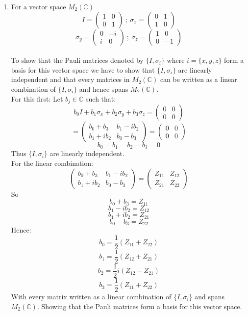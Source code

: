 \documentclass[12pt]{article}
\begin{document}
\begin{enumerate}
\begin{enumerate}
    \item For a vector space $M_2 (\mathbb{C})$
$$
I = \left( \begin{array}{cc} 1 & 0 \\ 0 & 1 \end{array} \right)  \ ; \ \sigma_x = \left( \begin{array}{cc} 0 & 1 \\ 1 & 0 \end{array} \right) 
$$
$$
\sigma_y = \left( \begin{array}{cc} 0 & -i \\ i & 0 \end{array} \right)  \ ; \ \sigma_z = \left( \begin{array}{cc} 1 & 0 \\ 0 & -1 \end{array} \right) 
$$
\\
To show that the Pauli matrices denoted by $\{I,\sigma_i\}$ where $i = \{x,y,z\}$ form a basis for this vector space we have to show that $\{I,\sigma_i\}$ are linearly independent and that every matrices in $M_2(\mathbb{C})$ can be written as a linear combination of $\{I,\sigma_i\}$ and hence spans $M_2(\mathbb{C})$.
\\ For this first: Let $b_j \in \mathbb{C}$ such that: 
$$ 
b_0 I +b_1 \sigma_x + b_2 \sigma_y + b_3 \sigma_z = \left( \begin{array}{cc} 0 & 0 \\ 0 & 0 \end{array} \right)
$$
$$ 
 = \left( \begin{array}{cc} b_0+b_3 & b_1-ib_2 \\ b_1+ib_2 & b_0-b_3 \end{array} \right) = \left( \begin{array}{cc} 0 & 0 \\ 0 & 0 \end{array} \right)
$$
$$
b_0 = b_1 =b_2 =b_3=0 $$
Thus $\{I,\sigma_i\}$ are linearly independent.
\\
For the linear combination:
$$ 
\left( \begin{array}{cc} b_0+b_3 & b_1-ib_2 \\ b_1+ib_2 & b_0-b_3 \end{array} \right) = \left( \begin{array}{cc} Z_{11} & Z_{12} \\ Z_{21} & Z_{22} \end{array} \right)
$$
So
$$ b_0 +b_3 = Z_{11} $$
$$ b_1 -ib_2 = Z_{12} $$
$$ b_1 +ib_2 = Z_{21} $$
$$ b_0 - b_3 = Z_{22} $$
Hence:
$$ b_0 = \frac{1}{2} (Z_{11} + Z_{22}) $$
$$ b_1 = \frac{1}{2}(Z_{12} +Z_{21}) $$
$$ b_2 = \frac{1}{2}i(Z_{12}-Z_{21})$$
$$ b_3 = \frac{1}{2}(Z_{11}+Z_{22}) $$ 
With every matrix written as a linear combination of $\{I,\sigma_i\}$ and spans $M_2(\mathbb{C})$. Showing that the Pauli matrices form a basis for this vector space. 



\end{enumerate}
\end{enumerate}
\end{document}
